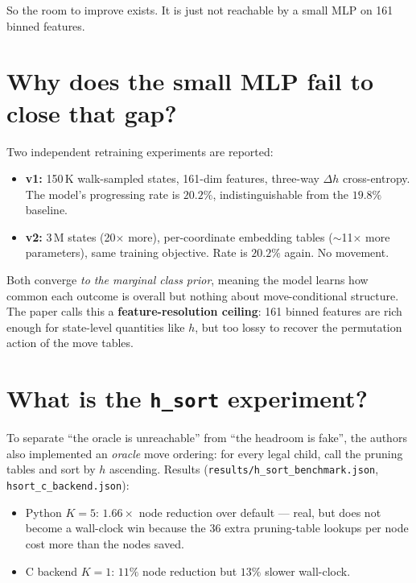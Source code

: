 \documentclass[11pt,a4paper]{article}
\newcommand{\defn}[1]{\textbf{#1}}
\begin{document}
So the room to improve exists. It is just not reachable by a small MLP
on 161 binned features.

\section{Why does the small MLP fail to close that gap?}

Two independent retraining experiments are reported:

\begin{itemize}[leftmargin=2em]
  \item \textbf{v1:} 150\,K walk-sampled states, 161-dim features,
        three-way $\Delta h$ cross-entropy. The model's progressing
        rate is $20.2\%$, indistinguishable from the
        $19.8\%$ baseline.
  \item \textbf{v2:} 3\,M states (20$\times$ more), per-coordinate
        embedding tables ($\sim$11$\times$ more parameters), same
        training objective. Rate is $20.2\%$ again. No movement.
\end{itemize}

Both converge \emph{to the marginal class prior}, meaning the model
learns how common each outcome is overall but nothing about
move-conditional structure. The paper calls this a
\defn{feature-resolution ceiling}: 161 binned features are rich enough
for state-level quantities like $h$, but too lossy to recover the
permutation action of the move tables.

\section{What is the \texttt{h\_sort} experiment?}

To separate ``the oracle is unreachable'' from ``the headroom is fake'',
the authors also implemented an \emph{oracle} move ordering: for every
legal child, call the pruning tables and sort by $h$ ascending. Results
(\texttt{results/\allowbreak h\_sort\_benchmark.json},
\texttt{hsort\_\allowbreak c\_backend.json}):

\begin{itemize}[leftmargin=2em]
  \item Python $K=5$: $1.66\times$ node reduction over default ---
        real, but does not become a wall-clock win because the 36
        extra pruning-table lookups per node cost more than the nodes
        saved.
  \item C backend $K=1$: $11\%$ node reduction but $13\%$ slower
        wall-clock.
\end{itemize}
\end{document}
